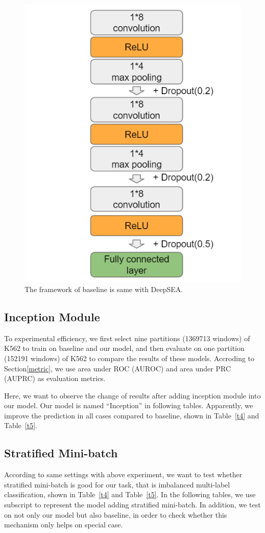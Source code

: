\begin{figure}[H]
    \centering
    \includegraphics[width=0.6\columnwidth]{body/figure/figure16.png}
    \captionsetup{labelfont=bf}
    \renewcommand{\baselinestretch}{1.0}
    \caption[Framework of baseline]{The framework of baseline is same with DeepSEA.}
    \label{f16}
\end{figure}

\subsection{Inception Module}
To experimental efficiency, we first select nine partitions (1369713 windows) of K562 to train on baseline and our model, and then evaluate on one partition (152191 windows) of K562 to compare the results of these models. Accroding to Section\ref{metric}, we use area under ROC (AUROC) and area under PRC (AUPRC) as evaluation metrics.

Here, we want to observe the change of results after adding inception module into our model. Our model is named “Inception” in following tables. Apparently, we improve the prediction in all cases compared to baseline, shown in Table~\ref{t4} and Table~\ref{t5}.

\subsection{Stratified Mini-batch} \label{strat}
According to same settings with above experiment, we want to test whether stratified mini-batch is good for our task, that is imbalanced multi-label classification, shown in Table~\ref{t4} and Table~\ref{t5}. In the following tables, we use subscript to represent the model adding stratified mini-batch. In addition, we test on not only our model but also baseline, in order to check whether this mechanism only helps on special case.

